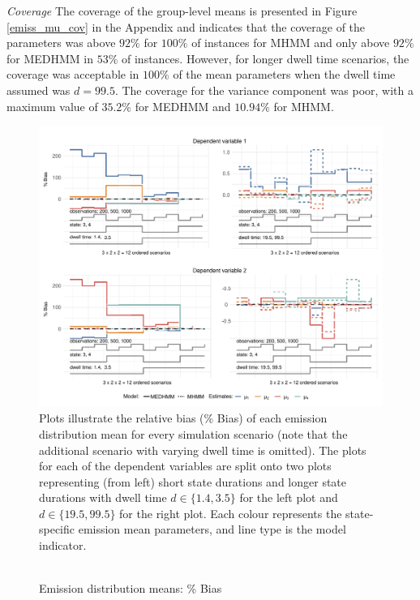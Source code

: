 \emph{Coverage}  The coverage of the group-level means is presented in Figure \ref{emiss_mu_cov} in the Appendix and indicates that the coverage of the parameters was above $92\%$ for $100\%$ of instances for MHMM and only above $92\%$ for MEDHMM in $53\%$ of instances. However, for longer dwell time scenarios, the coverage was acceptable in $100\%$ of the mean parameters when the dwell time assumed was $d=99.5$. The coverage for the variance component was poor, with a maximum value of $35.2\%$ for MEDHMM and $10.94\%$ for MHMM.  

\begin{figure}
\caption{\\Emission distribution means: \% Bias}
    \centering
    \includegraphics[width=\textwidth]{graphics/emiss_dep_bias2.pdf}
    \flushleft
    \footnotesize
    \justifying
    Plots illustrate the relative bias (\% Bias) of each emission distribution mean for every simulation scenario (note that the additional scenario with varying dwell time is omitted). The plots for each of the dependent variables are split onto two plots representing (from left) short state durations and longer state durations with dwell time $d\in \{1.4, 3.5\}$ for the left plot and $d\in \{19.5, 99.5\}$ for the right plot. Each colour represents the state-specific emission mean parameters, and line type is the model indicator.
    \label{mubias}
\end{figure}



